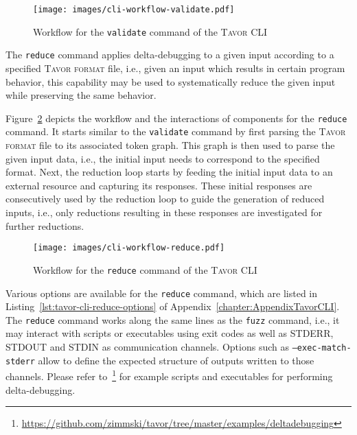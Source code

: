 \begin{figure}[hb]
\texttt{[image: images/cli-workflow-validate.pdf]}
\caption{Workflow for the \texttt{validate} command of the \textsc{Tavor CLI}}
\label{fig:cli-workflow-validate}
\end{figure}


\label{sec:tavor-cli-reduce}

The \texttt{reduce} command applies delta-debugging to a given input according to a specified \textsc{Tavor format} file, i.e., given an input which results in certain program behavior, this capability may be used to systematically reduce the given input while preserving the same behavior.

Figure~\ref{fig:cli-workflow-reduce} depicts the workflow and the interactions of components for the \texttt{reduce} command. It starts similar to the \texttt{validate} command by first parsing the \textsc{Tavor format} file to its associated token graph. This graph is then used to parse the given input data, i.e., the initial input needs to correspond to the specified format. Next, the reduction loop starts by feeding the initial input data to an external resource and capturing its responses. These initial responses are consecutively used by the reduction loop to guide the generation of reduced inputs, i.e., only reductions resulting in these responses are investigated for further reductions.

\begin{figure}[hb]
\texttt{[image: images/cli-workflow-reduce.pdf]}
\caption{Workflow for the \texttt{reduce} command of the \textsc{Tavor CLI}}
\label{fig:cli-workflow-reduce}
\end{figure}

Various options are available for the \texttt{reduce} command, which are listed in Listing~\ref{lst:tavor-cli-reduce-options} of Appendix~\ref{chapter:AppendixTavorCLI}. The \texttt{reduce} command works along the same lines as the \texttt{fuzz} command, i.e., it may interact with scripts or executables using exit codes as well as STDERR, STDOUT and STDIN as communication channels. Options such as \texttt{---exec-match-stderr} allow to define the expected structure of outputs written to those channels. Please refer to~\footnote{\url{https://github.com/zimmski/tavor/tree/master/examples/deltadebugging}} for example scripts and executables for performing delta-debugging.

